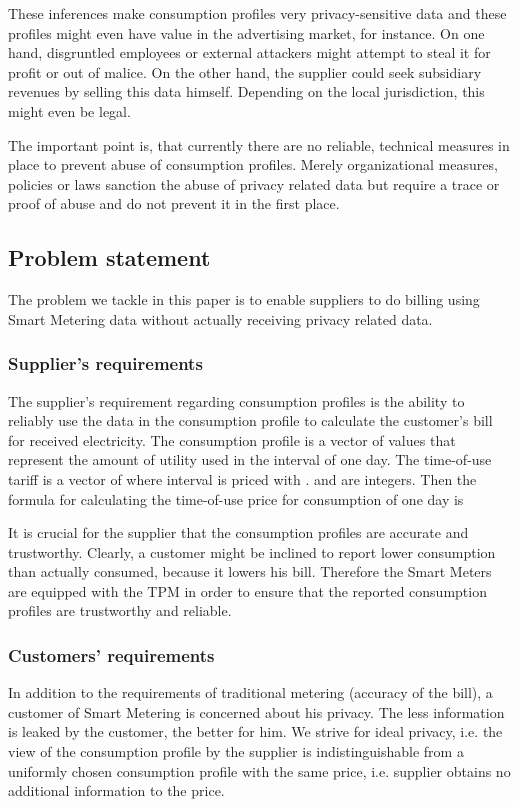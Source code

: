 \documentclass[english]{llncs}
\begin{document}
These inferences make consumption profiles very privacy-sensitive data and these profiles might even have value in the advertising market, for instance.
On one hand, disgruntled employees or external attackers might attempt to steal it for profit or out of malice.
On the other hand, the supplier could seek subsidiary revenues by selling this data himself.
Depending on the local jurisdiction, this might even be legal.

The important point is, that currently there are no reliable, technical measures in place to prevent abuse of consumption profiles.
Merely organizational measures, policies or laws sanction the abuse of privacy related data but require a trace or proof of abuse and do not prevent it in the first place.


\subsection{Problem statement}
\label{problemstatement}

The problem we tackle in this paper is to enable suppliers to do billing using Smart Metering data without actually receiving privacy related data. 


\subsubsection{Supplier's requirements}
\label{supplier_req}
The supplier's requirement regarding consumption profiles is the ability to reliably use the data in the consumption profile to calculate the customer's bill for received electricity.
The consumption profile  is a vector of  values  that represent the amount of utility used in the interval  of one day.
The time-of-use tariff  is a vector of   where interval  is priced with .  and  are integers.  
Then the formula for calculating the time-of-use price for consumption of one day is


It is crucial for the supplier that the consumption profiles are accurate and trustworthy.
Clearly, a customer might be inclined to report lower consumption than actually consumed, because it lowers his bill.
Therefore the Smart Meters are equipped with the TPM in order to ensure that the reported consumption profiles are trustworthy and reliable.

\subsubsection{Customers' requirements}
\label{customer_req}
In addition to the requirements of traditional metering (accuracy of the bill), a customer of Smart Metering is concerned about his privacy.
The less information is leaked by the customer, the better for him.
We strive for ideal privacy, i.e. the view of the consumption profile by the supplier is indistinguishable from a uniformly chosen consumption profile with the same price, i.e. supplier obtains no additional information to the price.
\end{document}
